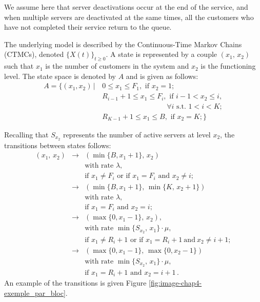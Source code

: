 \documentclass[conference]{IEEEtran}
\begin{document}
We assume here that server deactivations occur at the end of the service, and when multiple servers are deactivated at the same times, 
all the customers who have not completed their service return to the queue.



The underlying model is  described by the Continuous-Time Markov Chains (CTMCs), denoted   $\{X(t)\}_{t \geq 0}$.
A state is represented by a couple $(x_{1},\,x_{2})$ such that $x_{1}$ is the number of customers in the system and $x_{2}$ is the functioning level.
The state space is denoted by $A$ and is given as follows:
\begin{align*}
A=\{(x_{1},x_{2}) \, | \,  & 0 \leq x_{1} \leq F_{1},  \text{ if } x_{2}=1 ; \\
                           & R_{i-1}+1 \leq x_{1} \leq F_{i},  \text{ if } i-1<x_{2}\leq i, \\
                           & \qquad \qquad \qquad \qquad \quad \forall i \text{ s.t. } 1 < i < K ; \\
                           & R_{K-1}+1 \leq x_{1} \leq B,  \text{ if } x_{2}=K;
\}
\end{align*}


Recalling that   $S_{x_2}$ represents the number of active servers at level $x_2$, the transitions between states follows:
\begin{equation*}
\begin{array}{rcl}
\! \! (x_{1},\,x_{2})\! & \! \rightarrow & (\min\{B,x_{1}+1\},\,x_{2}) \\
                & & \! \text{with rate } \lambda , \\
                & & \! \text{if } x_{1} \neq F_i \text{ or if } x_1=F_i \text{ and } x_2 \neq i;\\
                & \! \rightarrow & (\min\{B,x_{1}+1\},\,\min\{K,\,x_{2}+1\}) \\
                & & \! \text{with rate } \lambda , \\
                & & \! \text{if } x_{1}=F_i \text{ and } x_2=i; \\   
                & \! \rightarrow &  (\max\{0,x_{1}-1\},\,x_{2}) , \\              
                & & \! \text{with rate }  \min\{S_{x_{2}},\,x_{1}\} \cdot \mu,    \\          
                & & \! \text{if } x_{1} \! \neq \! R_i \!+\! 1 \text{ or if } x_1 \! = \! R_i\!+\!1 \ \text{and} \ x_2 \! \neq \! i\!+\!1; \\
                & \! \rightarrow & (\max\{0,x_{1}-1\},\,\max\{0,x_{2}-1\}) \\               
                & & \! \text{with rate }   \min\{S_{x_{2}},\,x_{1}\} \cdot \mu,    \\             
                & & \! \text{if }   x_{1}=R_i+1  \text{ and }  x_2=i+1 \, .       
\end{array}
\end{equation*}
An example of the transitions is given Figure \ref{fig:image-chap4-exemple_par_bloc}.
\end{document}
